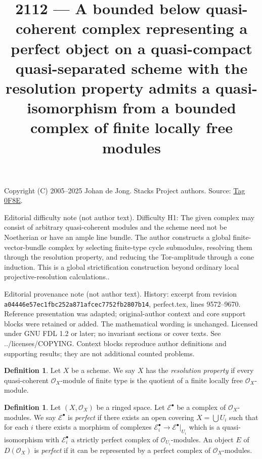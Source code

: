 \documentclass{amsart}
\theoremstyle{plain}
\theoremstyle{definition}
\newtheorem{definition}[subsection]{Definition}
\theoremstyle{remark}
\numberwithin{equation}{subsection}
\begin{document}
\title[Stacks Project, Tag 0F8E]{2112 --- A bounded below quasi-coherent complex representing a perfect object on a quasi-compact quasi-separated scheme with the resolution property admits a quasi-isomorphism from a bounded complex of finite locally free modules}
\maketitle
\noindent Copyright (C) 2005--2025 Johan de Jong. Stacks Project authors. Source: \href{https://stacks.math.columbia.edu/tag/0F8E}{Tag 0F8E}.

\noindent Editorial difficulty note (not author text). Difficulty H1: The given complex may consist of arbitrary quasi-coherent modules and the scheme need not be Noetherian or have an ample line bundle. The author constructs a global finite-vector-bundle complex by selecting finite-type cycle submodules, resolving them through the resolution property, and reducing the Tor-amplitude through a cone induction. This is a global strictification construction beyond ordinary local projective-resolution calculations..

\noindent Editorial provenance note (not author text). History: excerpt from revision \texttt{a0444\allowbreak 6e57e\allowbreak c1fbc\allowbreak 252a8\allowbreak 71afc\allowbreak ec775\allowbreak 2fb28\allowbreak 07b14}, perfect.tex, lines 9572--9670. Reference presentation was adapted; original-author context and core support blocks were retained or added. The mathematical wording is unchanged. Licensed under GNU FDL 1.2 or later; no invariant sections or cover texts. See ../licenses/COPYING. Context blocks reproduce author definitions and supporting results; they are not additional counted problems.

\begin{definition}
\label{definition-resolution-property}
Let $X$ be a scheme. We say $X$ has the {\it resolution property}
if every quasi-coherent $\mathcal{O}_X$-module of finite type
is the quotient of a finite locally free $\mathcal{O}_X$-module.
\end{definition}

\begin{definition}
\label{cohomology-definition-perfect}
Let $(X, \mathcal{O}_X)$ be a ringed space.
Let $\mathcal{E}^\bullet$ be a complex of $\mathcal{O}_X$-modules.
We say $\mathcal{E}^\bullet$ is {\it perfect} if there exists
an open covering $X = \bigcup U_i$ such that for each $i$
there exists a morphism of complexes
$\mathcal{E}_i^\bullet \to \mathcal{E}^\bullet|_{U_i}$
which is a quasi-isomorphism with $\mathcal{E}_i^\bullet$
a strictly perfect complex of $\mathcal{O}_{U_i}$-modules.
An object $E$ of $D(\mathcal{O}_X)$ is {\it perfect}
if it can be represented by a perfect complex of $\mathcal{O}_X$-modules.
\end{definition}
\end{document}
